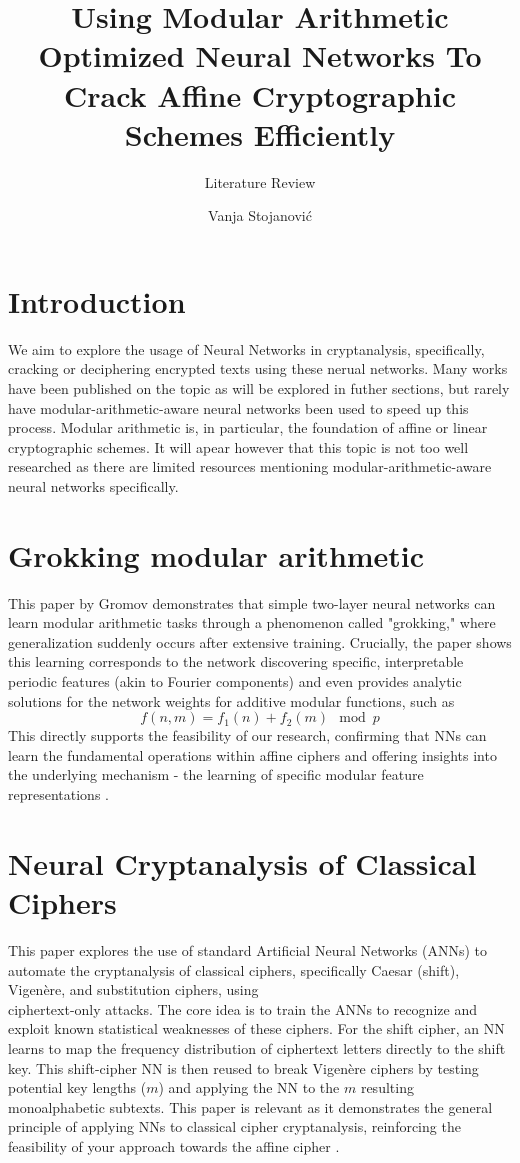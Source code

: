\documentclass[manuscript,screen,review,acmtog,natbib=false]{acmart}
\title{Using Modular Arithmetic Optimized Neural Networks To
Crack Affine Cryptographic Schemes Efficiently}
\subtitle{Literature Review}
\author{Vanja Stojanović}
\affiliation{
    \institution{University of Ljubljana}
    \department{Faculty of Mathematics and Physics}
    \city{Ljubljana}
    \country{Slovenia}
}
\begin{document}
    \maketitle

    \section{Introduction}
    We aim to explore the usage of Neural Networks in cryptanalysis, 
    specifically, cracking or deciphering encrypted texts using
    these nerual networks. Many works have been published on the
    topic as will be explored in futher sections, but rarely have
    modular-arithmetic-aware neural networks been used to speed up this process.
    Modular arithmetic is, in particular, the foundation of affine or linear
    cryptographic schemes. It will apear however that this topic is not too well researched
    as there are limited resources mentioning modular-arithmetic-aware neural networks specifically.

    \section{Grokking modular arithmetic}
    This paper by Gromov demonstrates that simple two-layer neural networks 
    can learn modular arithmetic tasks through a phenomenon called "grokking,"
    where generalization suddenly occurs after extensive training. Crucially,
    the paper shows this learning corresponds to the network discovering specific,
    interpretable periodic features (akin to Fourier components) and even provides
    analytic solutions for the network weights for additive modular functions, such as
    \[
        f(n,m) = f_1(n) + f_2(m) \mod p
    \]
    This directly supports the feasibility of our research, confirming that NNs
    can learn the fundamental operations within affine ciphers and offering insights into
    the underlying mechanism - the learning of specific modular feature representations \cite{gromov2023}.

    \section{Neural Cryptanalysis of Classical Ciphers}
    This paper explores the use of standard Artificial Neural Net\-work\-s (ANNs)
    to automate the cryptanalysis of classical ciphers, specifically Caesar (shift), 
    Vigenère, and substitution ciphers, using\\ciphertext-only attacks. The core idea 
    is to train the ANNs to recognize and exploit known statistical weaknesses of 
    these ciphers. For the shift cipher, an NN learns to map the frequency distribution 
    of ciphertext letters directly to the shift key. This shift-cipher NN is then reused to 
    break Vigenère ciphers by testing potential key lengths ($m$) and applying the NN
    to the $m$ resulting monoalphabetic subtexts. This paper is relevant as it demonstrates
    the general principle of applying NNs to classical cipher cryptanalysis, reinforcing 
    the feasibility of your approach towards the affine cipher \cite{Focardi2018NeuralCO}.
\end{document}
